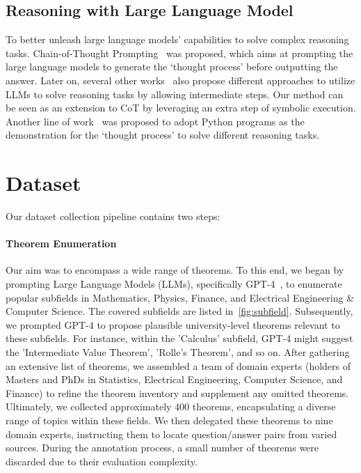 \documentclass[11pt]{article}
\begin{document}
\subsection{Reasoning with Large Language Model}
To better unleash large language models' capabilities to solve complex reasoning tasks. Chain-of-Thought Prompting~\cite{weichain,kojimalarge,wang2022self} was proposed, which aims at prompting the large language models to generate the `thought process' before outputting the answer. Later on, several other works~\cite{drozdov2022compositional,zhou2022least,nyeshow} also propose different approaches to utilize LLMs to solve reasoning tasks by allowing intermediate steps. Our method can be seen as an extension to CoT by leveraging an extra step of symbolic execution. Another line of work~\cite{gao2022pal,chen2022program} was proposed to adopt Python programs as the demonstration for the `thought process' to solve different reasoning tasks.

\section{Dataset}
Our dataset collection pipeline contains two steps:

\paragraph{Theorem Enumeration}
Our aim was to encompass a wide range of theorems. To this end, we began by prompting Large Language Models (LLMs), specifically GPT-4~\cite{gpt4}, to enumerate popular subfields in Mathematics, Physics, Finance, and Electrical Engineering \& Computer Science. The covered subfields are listed in~\autoref{fig:subfield}. Subsequently, we prompted GPT-4 to propose plausible university-level theorems relevant to these subfields. For instance, within the 'Calculus' subfield, GPT-4 might suggest the 'Intermediate Value Theorem', 'Rolle's Theorem', and so on. After gathering an extensive list of theorems, we assembled a team of domain experts (holders of Masters and PhDs in Statistics, Electrical Engineering, Computer Science, and Finance) to refine the theorem inventory and supplement any omitted theorems. Ultimately, we collected approximately 400 theorems, encapsulating a diverse range of topics within these fields. We then delegated these theorems to nine domain experts, instructing them to locate question/answer pairs from varied sources. During the annotation process, a small number of theorems were discarded due to their evaluation complexity.
\end{document}
